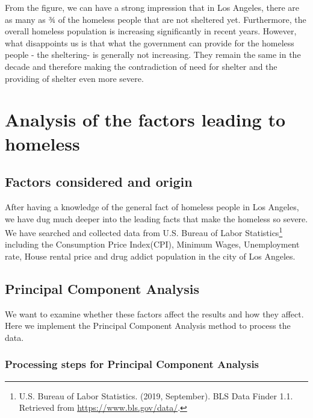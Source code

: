 \documentclass[]{article}
\let\rmarkdownfootnote\footnote%
\def\footnote{\protect\rmarkdownfootnote}
\begin{document}
From the figure, we can have a strong impression that in Los Angeles,
there are as many as ¾ of the homeless people that are not sheltered
yet. Furthermore, the overall homeless population is increasing
significantly in recent years. However, what disappoints us is that what
the government can provide for the homeless people - the sheltering- is
generally not increasing. They remain the same in the decade and
therefore making the contradiction of need for shelter and the providing
of shelter even more severe.

\hypertarget{analysis-of-the-factors-leading-to-homeless}{%
\section{Analysis of the factors leading to
homeless}\label{analysis-of-the-factors-leading-to-homeless}}

\hypertarget{factors-considered-and-origin}{%
\subsection{Factors considered and
origin}\label{factors-considered-and-origin}}

After having a knowledge of the general fact of homeless people in Los
Angeles, we have dug much deeper into the leading facts that make the
homeless so severe. We have searched and collected data from U.S. Bureau
of Labor Statistics\footnote{U.S. Bureau of Labor Statistics. (2019,
  September). BLS Data Finder 1.1. Retrieved from
  \url{https://www.bls.gov/data/}.} including the Consumption Price
Index(CPI), Minimum Wages, Unemployment rate, House rental price and
drug addict population in the city of Los Angeles.

\hypertarget{principal-component-analysis}{%
\subsection{Principal Component
Analysis}\label{principal-component-analysis}}

We want to examine whether these factors affect the results and how they
affect. Here we implement the Principal Component Analysis method to
process the data.

\hypertarget{processing-steps-for-principal-component-analysis}{%
\subsubsection{Processing steps for Principal Component
Analysis}\label{processing-steps-for-principal-component-analysis}}
\end{document}
